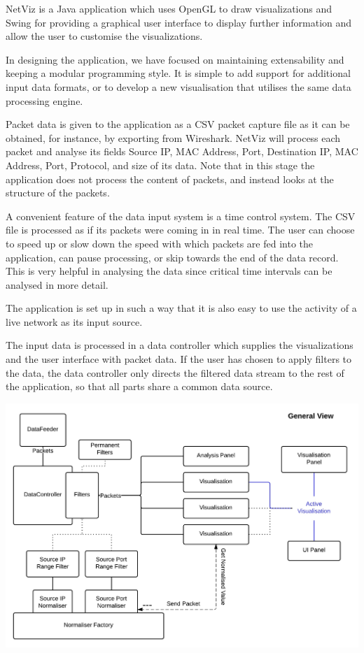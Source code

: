 NetViz is a Java application which uses OpenGL to draw visualizations and Swing for providing a graphical user interface to display further information and allow the user to customise the visualizations.

In designing the application, we have focused on maintaining extensability and keeping a modular programming style. It is simple to add support for additional input data formats, or to develop a new visualisation that utilises the same data processing engine.

Packet data is given to the application as a CSV packet capture file as it can be obtained, for instance, by exporting from Wireshark. NetViz will process each packet and analyse its fields Source IP, MAC Address, Port, Destination IP, MAC Address, Port, Protocol, and size of its data. Note that in this stage the application does not process the content of packets, and instead looks at the structure of the packets.

A convenient feature of the data input system is a time control system. The CSV file is processed as if its packets were coming in in real time. The user can choose to speed up or slow down the speed with which packets are fed into the application, can pause processing, or skip towards the end of the data record. This is very helpful in analysing the data since critical time intervals can be analysed in more detail.

The application is set up in such a way that it is also easy to use the activity of a live network as its input source.

The input data is processed in a data controller which supplies the visualizations and the user interface with packet data. If the user has chosen to apply filters to the data, the data controller only directs the filtered data stream to the rest of the application, so that all parts share a common data source.

\includegraphics[width=\linewidth]{materials/architecture.jpg}

